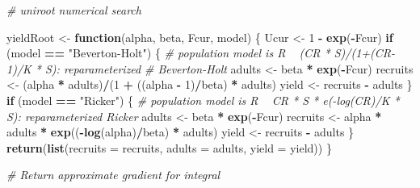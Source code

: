 \documentclass[]{article}
\newenvironment{Shaded}{\begin{snugshade}}{\end{snugshade}}
\newcommand{\CommentTok}[1]{\textcolor[rgb]{0.56,0.35,0.01}{\textit{#1}}}
\newcommand{\ControlFlowTok}[1]{\textcolor[rgb]{0.13,0.29,0.53}{\textbf{#1}}}
\newcommand{\DataTypeTok}[1]{\textcolor[rgb]{0.13,0.29,0.53}{#1}}
\newcommand{\DecValTok}[1]{\textcolor[rgb]{0.00,0.00,0.81}{#1}}
\newcommand{\KeywordTok}[1]{\textcolor[rgb]{0.13,0.29,0.53}{\textbf{#1}}}
\newcommand{\NormalTok}[1]{#1}
\newcommand{\OperatorTok}[1]{\textcolor[rgb]{0.81,0.36,0.00}{\textbf{#1}}}
\newcommand{\StringTok}[1]{\textcolor[rgb]{0.31,0.60,0.02}{#1}}
\begin{document}
\begin{Shaded}
\begin{Highlighting}[]
\CommentTok{# uniroot numerical search}

\NormalTok{yieldRoot <-}\StringTok{ }\ControlFlowTok{function}\NormalTok{(alpha, beta, Fcur, model) \{}
\NormalTok{    Ucur <-}\StringTok{ }\DecValTok{1} \OperatorTok{-}\StringTok{ }\KeywordTok{exp}\NormalTok{(}\OperatorTok{-}\NormalTok{Fcur)}
    \ControlFlowTok{if}\NormalTok{ (model }\OperatorTok{==}\StringTok{ "Beverton-Holt"}\NormalTok{) \{}
        \CommentTok{# population model is R ~ (CR * S)/(1+(CR-1)/K * S): reparameterized}
        \CommentTok{# Beverton-Holt}
\NormalTok{        adults <-}\StringTok{ }\NormalTok{beta }\OperatorTok{*}\StringTok{ }\KeywordTok{exp}\NormalTok{(}\OperatorTok{-}\NormalTok{Fcur)}
\NormalTok{        recruits <-}\StringTok{ }\NormalTok{(alpha }\OperatorTok{*}\StringTok{ }\NormalTok{adults)}\OperatorTok{/}\NormalTok{(}\DecValTok{1} \OperatorTok{+}\StringTok{ }\NormalTok{((alpha }\OperatorTok{-}\StringTok{ }\DecValTok{1}\NormalTok{)}\OperatorTok{/}\NormalTok{beta) }\OperatorTok{*}\StringTok{ }\NormalTok{adults)}
\NormalTok{        yield <-}\StringTok{ }\NormalTok{recruits }\OperatorTok{-}\StringTok{ }\NormalTok{adults}
\NormalTok{    \}}
    \ControlFlowTok{if}\NormalTok{ (model }\OperatorTok{==}\StringTok{ "Ricker"}\NormalTok{) \{}
        \CommentTok{# population model is R ~ CR * S * e(-log(CR)/K * S): reparameterized Ricker}
\NormalTok{        adults <-}\StringTok{ }\NormalTok{beta }\OperatorTok{*}\StringTok{ }\KeywordTok{exp}\NormalTok{(}\OperatorTok{-}\NormalTok{Fcur)}
\NormalTok{        recruits <-}\StringTok{ }\NormalTok{alpha }\OperatorTok{*}\StringTok{ }\NormalTok{adults }\OperatorTok{*}\StringTok{ }\KeywordTok{exp}\NormalTok{((}\OperatorTok{-}\KeywordTok{log}\NormalTok{(alpha)}\OperatorTok{/}\NormalTok{beta) }\OperatorTok{*}\StringTok{ }\NormalTok{adults)}
\NormalTok{        yield <-}\StringTok{ }\NormalTok{recruits }\OperatorTok{-}\StringTok{ }\NormalTok{adults}
\NormalTok{    \}}
    \KeywordTok{return}\NormalTok{(}\KeywordTok{list}\NormalTok{(}\DataTypeTok{recruits =}\NormalTok{ recruits, }\DataTypeTok{adults =}\NormalTok{ adults, }\DataTypeTok{yield =}\NormalTok{ yield))}
\NormalTok{\}}

\CommentTok{# Return approximate gradient for integral}


\end{Highlighting}
\end{Shaded}
\end{document}
